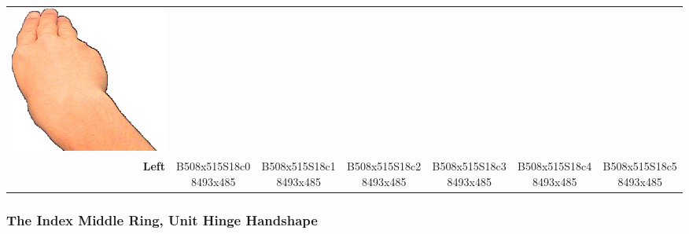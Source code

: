 \documentclass{article}
\begin{document}
\begin{center}
\begin{tabular}{r*{6}{c}}
\includegraphics[scale=0.1]{images/06-04-6.jpg}\\
\textbf{Left}&
B508x515S18c08493x485&
B508x515S18c18493x485&
B508x515S18c28493x485&
B508x515S18c38493x485&
B508x515S18c48493x485&
B508x515S18c58493x485\\
\end{tabular}
\end{center}

\subsubsection{The Index Middle Ring, Unit Hinge Handshape}
\end{document}
